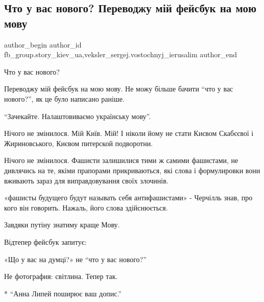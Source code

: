  
 
 
 
 
 
\subsection{Что у вас нового? Переводжу мій фейсбук на мою мову}
\label{sec:26_02_2022.fb.fb_group.story_kiev_ua.2.scho_u_vas_novogo}
 
\ifcmt
 author_begin
   author_id fb_group.story_kiev_ua,veksler_sergej.vostochnyj_ierusalim
 author_end
\fi

Что у вас нового?

Переводжу мій фейсбук на мою мову. Не можу більше бачити \enquote{что у вас нового?},
як це було написано раніше.

\enquote{Зачекайте. Налаштовиваємо українську мову}.


Нічого не змінилося. Мій Київ. Мій! І ніколи йому не стати Києвом Скабєєвої і
Жириновського, Києвом питерской подворотни.

Нічого не змінилося. Фашисти залишилися тими ж самими фашистами, не дивлячись
на те, якіми прапорами прикриваються, які слова і формулировки вони вживають
зараз для виправдовування своїх злочинів. 


«фашисты будущего будут называть себя антифашистами» - Черчілль знав, про кого
він говорить. Нажаль, його слова здійснюється.

Завдяки путіну знатиму краще Мову.

Відтепер фейсбук запитує:

«Що у вас на думці?» не \enquote{что у вас нового?}

Не фотография: світлина. Тепер так.

* \enquote{Анна Липей поширює ваш допис.}

